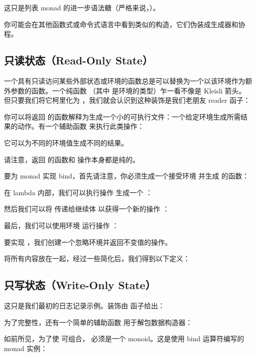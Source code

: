 这只是列表 monad 的进一步语法糖（严格来说，）。

你可能会在其他函数式或命令式语言中看到类似的构造，它们伪装成生成器和协程。

\subsection{只读状态（Read-Only State）}

一个具有只读访问某些外部状态或环境的函数总是可以替换为一个以该环境作为额外参数的函数。一个纯函数 （其中  是环境的类型）乍一看不像是 Kleisli 箭头。但只要我们将它柯里化为 ，我们就会认识到这种装饰是我们老朋友 reader 函子：

你可以将返回  的函数解释为生成一个小的可执行文件：一个给定环境生成所需结果的动作。有一个辅助函数  来执行此类操作：

它可以为不同的环境值生成不同的结果。

请注意，返回  的函数和  操作本身都是纯的。

要为  monad 实现 bind，首先请注意，你必须生成一个接受环境  并生成  的函数：

在 lambda 内部，我们可以执行操作  生成一个 ：

然后我们可以将  传递给继续体  以获得一个新的操作 ：

最后，我们可以使用环境  运行操作 ：

要实现 ，我们创建一个忽略环境并返回不变值的操作。

将所有内容放在一起，经过一些简化后，我们得到以下定义：


\subsection{只写状态（Write-Only State）}

这只是我们最初的日志记录示例。装饰由  函子给出：

为了完整性，还有一个简单的辅助函数  用于解包数据构造器：

如前所见，为了使  可组合， 必须是一个 monoid。这是使用 bind 运算符编写的  monad 实例：


